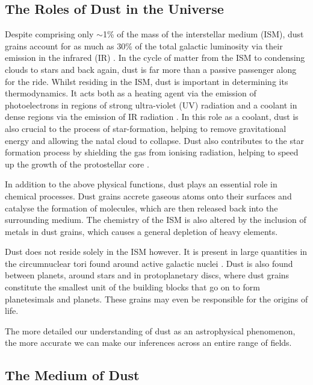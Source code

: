 \subsection{The Roles of Dust in the Universe}

Despite comprising only $\sim$1\% of the mass of the interstellar medium (ISM), dust grains account for as much as 30\% of the total galactic luminosity via their emission in the infrared (IR) \citep{Li2003}.  In the cycle of matter from the ISM to condensing clouds to stars and back again, dust is far more than a passive passenger along for the ride.  Whilst residing in the ISM, dust is important in determining its thermodynamics.  It acts both as a heating agent via the emission of photoelectrons in regions of strong ultra-violet (UV) radiation and a coolant in dense regions via the emission of IR radiation \citep{Tielens2005}.  In this role as a coolant, dust is also crucial to the process of star-formation, helping to remove gravitational energy and allowing the natal cloud to collapse.  Dust also contributes to the star formation process by shielding the gas from ionising radiation, helping to speed up the growth of the protostellar core \citep{Draine2011}. 

In addition to the above physical functions, dust plays an essential role in chemical processes.  Dust grains  accrete gaseous atoms onto their surfaces and catalyse the formation of molecules, which are then released back into the surrounding medium.  The chemistry of the ISM is also altered by the inclusion of metals in dust grains, which causes a general depletion of heavy elements.

Dust does not reside solely in the ISM however.  It is present in  large quantities in the circumnuclear tori found around active galactic nuclei \citep{Jaffe2004}.  Dust is also found between planets, around stars and in protoplanetary discs, where dust grains constitute the smallest unit of the building blocks that  go on to form planetesimals and planets.  These grains may even be responsible for the origins of life.  

The more detailed our understanding of dust as an astrophysical phenomenon, the more accurate we can make our inferences across an entire range of  fields.  


\subsection{The Medium of Dust}
\label{scn:dust_med}

